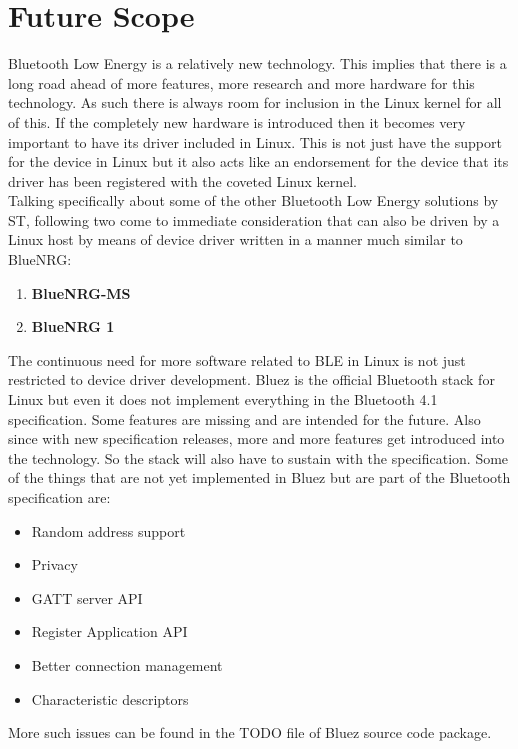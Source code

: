 \section{Future Scope}
Bluetooth Low Energy is a relatively new technology. This implies that there is a long road ahead of more features, more research and more hardware for this technology. As such there is always room for inclusion in the Linux kernel for all of this. If the completely new hardware is introduced then it becomes very important to have its driver included in Linux. This is not just have the support for the device in Linux but it also acts like an endorsement for the device that its driver has been registered with the coveted Linux kernel.\\
Talking specifically about some of the other Bluetooth Low Energy solutions by ST, following two come to immediate consideration that can also be driven by a Linux host by means of device driver written in a manner much similar to BlueNRG:
\begin{enumerate}
	\item \textbf{BlueNRG-MS}
	\item \textbf{BlueNRG 1}
\end{enumerate}
The continuous need for more software related to BLE in Linux is not just restricted to device driver development. Bluez is the official Bluetooth stack for Linux but even it does not implement everything in the Bluetooth 4.1 specification. Some features are missing and are intended for the future. Also since with new specification releases, more and more features get introduced into the technology. So the stack will also have to sustain with the specification. Some of the things that are not yet implemented in Bluez but are part of the Bluetooth specification are:
\begin{itemize}
	\item Random address support
	\item Privacy
	\item GATT server API
	\item Register Application API
	\item Better connection management
	\item Characteristic descriptors
\end{itemize}
More such issues can be found in the TODO file of Bluez source code package.
